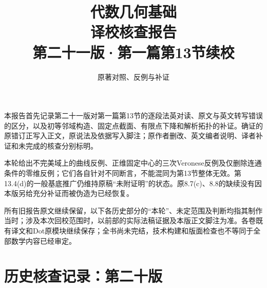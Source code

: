 
\newcommand{\RR}{\mathcal R}
\newcommand{\FF}{\mathcal F}
\newcommand{\GG}{\mathcal G}
\newcommand{\MM}{\mathcal M}
\newcommand{\JJ}{\mathcal J}
\newcommand{\oldauditsrc}[1]{\par\noindent\textbf{原文位置：}#1。\par}
\newcommand{\kind}[2]{\noindent\textbf{分类：#1。}\ #2\par}
\newcommand{\lead}[1]{\par\noindent\textbf{#1}\quad}
\newenvironment{analysisproof}{\par\noindent\textbf{该轮核查的反例或补证。}\ }{\par}

\title{代数几何基础\\译校核查报告\\[1em]\large 第二十一版·第一篇第13节续校}
\author{原著对照、反例与补证}
\date{}

\frontmatter
\maketitle
{}
本报告首先记录第二十一版对第一篇第13节的逐段法英对读、原文与英文转写错误的区分，以及初等邻域构造、固定点截面、有限点下降和解析拓扑的补证。确证的原错订正写入正文，原说法及依据写入脚注；原作者删改、英文编者说明、译者补证和未完成的核查分别标明。

本轮给出不完美域上的曲线反例、正维固定中心的三次Veronese反例及仅删除连通条件的零维反例；它们各自针对不同断言，不能混同为第13节整体无效。第13.4(d)的一般基底推广仍维持原稿“未附证明”的状态。原8.7(c)、8.8的缺续没有因本版另给充分补证而被伪造为已经恢复。

所有旧报告原文继续保留，以下各历史部分的“本轮”、未定范围及判断均指其制作当时；涉及本次回校范围时，以前部的实际法稿证据及本版正文脚注为准。各卷既有译文和Dot原模块继续保存；全书尚未完结，技术构建和版面检查也不等同于全部数学内容已经审定。

\tableofcontents
\mainmatter




\setcounter{secnumdepth}{-2}
\part{历史核查记录：第二十版}
\setcounter{secnumdepth}{2}





\setcounter{secnumdepth}{-2}
